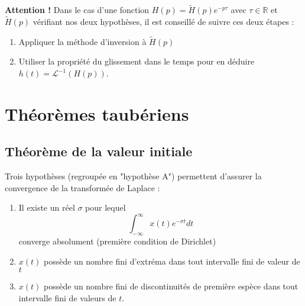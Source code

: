 		\textbf{Attention !} Dans le cas d'une fonction $H(p) = \tilde{H}(p)e^{-p\tau}$ avec $\tau 
		\in \mathbb{R}$ et $\tilde{H}(p)$ vérifiant nos deux hypothèses, il est conseillé de suivre
		ces deux étapes :
		\begin{enumerate}
		\item Appliquer la méthode d'inversion à $\tilde{H}(p)$
		\item Utiliser la propriété du glissement dans le temps pour en déduire $h(t) = \mathcal{L}^{-1}
		(H(p))$.
		\end{enumerate}



\section{Théorèmes taubériens}

	\subsection{Théorème de la valeur initiale}
	Trois hypothèses (regroupée en "hypothèse A") permettent d'assurer la convergence de la transformée
	de Laplace :
	\begin{enumerate}
	\item Il existe un réel $\sigma$ pour lequel 
	\begin{equation}
	\int_{-\infty}^{\infty} x(t)e^{-\sigma t}dt
	\end{equation}
	converge absolument (première condition de Dirichlet)
	\item $x(t)$ possède un nombre fini d'extréma dans tout intervalle fini de valeur de $t$
	\item $x(t)$ possède un nombre fini de discontinuités de première espèce dans tout intervalle
	fini de valeurs de $t$.
	\end{enumerate}
	
	\ 
	

